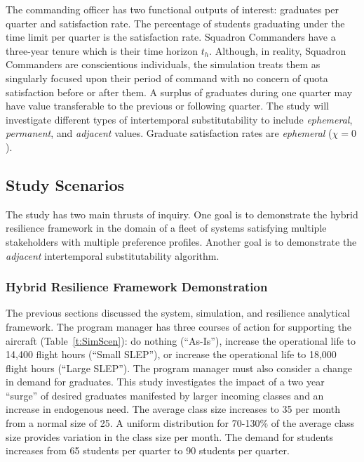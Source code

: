 \documentclass[preprint,12pt]{elsarticle}
\begin{document}
The commanding officer has two functional outputs of interest:
graduates per quarter and satisfaction rate. The
percentage of students graduating under the time limit per quarter is
the satisfaction rate. Squadron Commanders have a three-year
tenure which is their time horizon $t_h$. Although, in reality,
Squadron Commanders are conscientious 
individuals, the simulation treats them as singularly focused upon
their period of command with no concern of quota satisfaction before
or after them. A surplus of graduates during one quarter may have value
transferable to the previous or following quarter. The study will
investigate different types of intertemporal substitutability to include
\emph{ephemeral}, \emph{permanent}, and \emph{adjacent}
values. Graduate satisfaction rates are \emph{ephemeral} ($\chi = 0$).


\subsection{Study Scenarios}

The study has two main thrusts of inquiry. One goal is to demonstrate
the hybrid resilience framework in the domain of a fleet of systems
satisfying multiple stakeholders with multiple preference
profiles. Another goal is to demonstrate the \emph{adjacent}
intertemporal substitutability algorithm.

\subsubsection{Hybrid Resilience Framework Demonstration}

The previous sections discussed the system, simulation, and resilience
analytical framework. The program manager has three courses of action
for supporting the aircraft (Table~\ref{t:SimScen}): do nothing
(``As-Is''), increase the operational life to 14,400 flight hours
(``Small SLEP''), or increase the operational life to 18,000 flight
hours (``Large SLEP''). The program manager must also consider a
change in demand for graduates. This study investigates the impact of
a two year ``surge'' of desired graduates manifested by larger
incoming classes and an increase in endogenous need. The average class
size increases to 35 per month from a normal size of 25. A uniform
distribution for 70-130\% of the average class size 
provides variation in the class size per month. The demand
for students increases from 65 students per quarter to 90 students per
quarter. 
\end{document}
